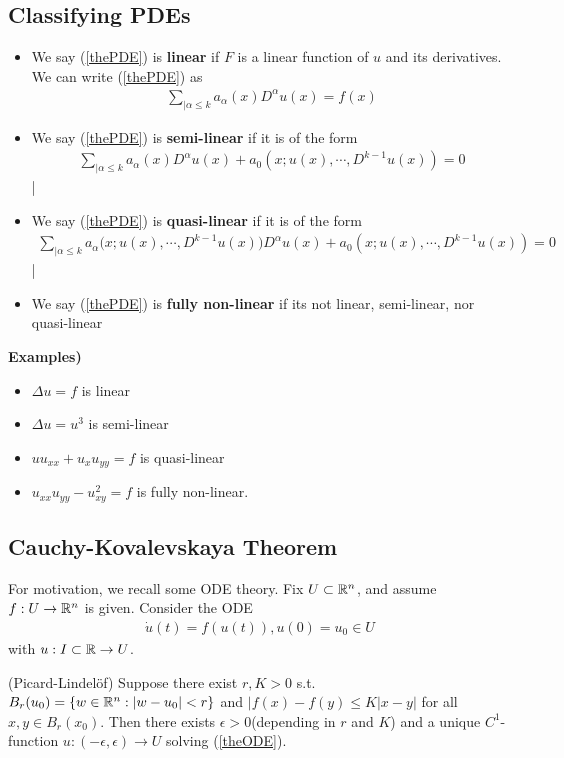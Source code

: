 \documentclass[12pt,a4paper]{report}
\begin{document}
\subsection*{Classifying PDEs}
\begin{itemize}
\item We say (\ref{thePDE}) is \textbf{linear} if $F$ is a linear function of $u$ and its derivatives. We can write (\ref{thePDE}) as 
\begin{align*}
\sum_{|\alpha \leq k} a_{\alpha}(x) D^{\alpha}u(x) = f(x)
\end{align*}
\item We say (\ref{thePDE}) is \textbf{semi-linear} if it is of the form
\begin{align*}
\sum_{|\alpha \leq k} a_{\alpha}(x) D^{\alpha}u(x) + a_0(x;u(x),\cdots,D^{k-1}u(x)) = 0
\end{align*}|
\item We say (\ref{thePDE}) is \textbf{quasi-linear} if it is of the form
\begin{align*}
\sum_{|\alpha \leq k} a_{\alpha}\big(x;u(x),\cdots,D^{k-1}u(x) \big) D^{\alpha}u(x) + a_0(x;u(x),\cdots,D^{k-1}u(x)) = 0
\end{align*}|
\item We say (\ref{thePDE}) is \textbf{fully non-linear} if its not linear, semi-linear, nor quasi-linear
\end{itemize}
\s

\textbf{Examples)}
\begin{itemize}
\item $\Delta u = f$ is linear
\item $\Delta u =u^3$ is semi-linear
\item $uu_{xx} + u_x u_{yy} = f$ is quasi-linear
\item $u_{xx}u_{yy} - u_{xy}^2 = f$ is fully non-linear.
\end{itemize}
\s

\subsection*{Cauchy-Kovalevskaya Theorem}
For motivation, we recall some ODE theory. Fix $U \subset \mathbb{R}^n$, and assume $f:U \rightarrow \mathbb{R}^n$ is given. Consider the ODE
\begin{align}
\dot{u}(t) = f(u(t)), u(0)=u_0 \in U \label{theODE}
\end{align}
with $u : I \subset \mathbb{R} \rightarrow U$.
\s

\thm (Picard-Lindel\"{o}f) Suppose there exist $r,K>0$ s.t. $B_r(u_0) = \{ w\in \mathbb{R}^n : |w-u_0|<r\}$ and $|f(x)-f(y) \leq K|x-y|$ for all $x,y \in B_r(x_0)$. Then there exists $\epsilon >0$(depending in $r$ and $K$) and a unique $C^1$-function $u : (-\epsilon,\epsilon)\rightarrow U$ solving (\ref{theODE}).
\end{document}
